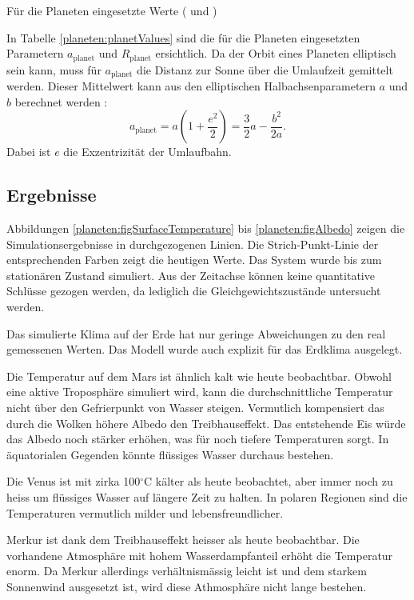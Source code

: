 \begin{refsection}
\begin{table}
\caption{Für die Planeten eingesetzte Werte (\cite{planeten:radius} und \cite{planeten:semiMinorAxis})}
\label{planeten:planetValues}
\end{table}
In Tabelle \ref{planeten:planetValues} sind die für die Planeten eingesetzten Parametern $a_{\text{planet}}$ und $R_{\text{planet}}$ ersichtlich. Da der Orbit eines Planeten elliptisch sein kann, muss für $a_{\text{planet}}$ die Distanz zur Sonne über die Umlaufzeit gemittelt werden. Dieser Mittelwert kann aus den elliptischen Halbachsenparametern $a$ und $b$ berechnet werden \cite{planeten:umlaufbahn}:
\begin{equation}
a_{\text{planet}} = a \left(1+{\frac {e^{2}}{2}}\right) = \frac{3}{2}a - \frac{b^2}{2a} \text{.}
\end{equation}
Dabei ist $e$ die Exzentrizität der Umlaufbahn.



\subsection{Ergebnisse}

	Abbildungen \ref{planeten:figSurfaceTemperature} bis \ref{planeten:figAlbedo} zeigen die Simulationsergebnisse in durchgezogenen Linien. Die Strich-Punkt-Linie der entsprechenden Farben zeigt die heutigen Werte. Das System wurde bis zum stationären Zustand simuliert. Aus der Zeitachse können keine quantitative Schlüsse gezogen werden, da lediglich die Gleichgewichtszustände untersucht werden.
		
	Das simulierte Klima auf der Erde hat nur geringe Abweichungen zu den real gemessenen Werten. Das Modell wurde auch explizit für das Erdklima ausgelegt.
	
	Die Temperatur auf dem Mars ist ähnlich kalt wie heute beobachtbar. Obwohl eine aktive Troposphäre simuliert wird, kann die durchschnittliche Temperatur nicht über den Gefrierpunkt von Wasser steigen. Vermutlich kompensiert das durch die Wolken höhere Albedo den Treibhauseffekt. Das entstehende Eis würde das Albedo noch stärker erhöhen, was für noch tiefere Temperaturen sorgt. In äquatorialen Gegenden könnte flüssiges Wasser durchaus bestehen.
	
	Die Venus ist mit zirka 100$^\circ$C kälter als heute beobachtet, aber immer noch zu heiss um flüssiges Wasser auf längere Zeit zu halten. In polaren Regionen sind die Temperaturen vermutlich milder und lebensfreundlicher.
	
	Merkur ist dank dem Treibhauseffekt heisser als heute beobachtbar. Die vorhandene Atmosphäre mit hohem Wasserdampfanteil erhöht die Temperatur enorm. Da Merkur allerdings verhältnismässig leicht ist und dem starkem Sonnenwind ausgesetzt ist, wird diese Athmosphäre nicht lange bestehen.


\end{refsection}
